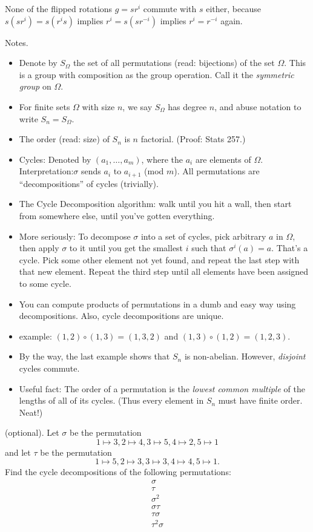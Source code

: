 \documentclass[1    0pt, answers]{exam} \renewcommand{\baselinestretch}{1.05}
\theoremstyle{plain}
\theoremstyle{definition}
\begin{document}
\begin{questions}
\begin{solution}
None of the flipped rotations $g = sr^i$ commute with $s$ either, because $s (s r^i) = s (r^i s)$ implies $r^i = s (s r^{-i})$ implies $r^i = r^{-i}$ again.
\end{solution}

Notes.
\begin{itemize}
    \item Denote by $S_{\Omega}$ the set of all permutations (read: bijections) of the set $\Omega$. This is a group with composition as the group operation. Call it the \emph{symmetric group} on $\Omega$.
    \item For finite sets $\Omega$ with size $n$, we say $S_{\Omega}$ has degree $n$, and abuse notation to write $S_n = S_{\Omega}$.
    \item The order (read: size) of $S_n$ is $n$ factorial. (Proof: Stats 257.)
    \item Cycles: Denoted by $(a_1, \ldots, a_m)$, where the $a_i$ are elements of $\Omega$. Interpretation:$\sigma$ sends $a_i$ to $a_{i + 1}$ (mod $m$). All permutations are ``decompositions'' of cycles (trivially).
    \item The Cycle Decomposition algorithm: walk until you hit a wall, then start from somewhere else, until you've gotten everything. 
    \item More seriously: To decompose $\sigma$ into a set of cycles, pick arbitrary $a$ in $\Omega$, then apply $\sigma$ to it until you get the smallest $i$ such that $\sigma^i(a) = a$. That's a cycle. Pick some other element not yet found, and repeat the last step with that new element. Repeat the third step until all elements have been assigned to some cycle.
    \item You can compute products of permutations in a dumb and easy way using decompositions. Also, cycle decompositions are unique.
    \item example: $(1,2) \circ (1,3) = (1, 3, 2)$ and $(1, 3) \circ (1, 2) = (1, 2, 3)$.
    \item By the way, the last example shows that $S_n$ is non-abelian. However, \emph{disjoint} cycles commute.
    \item Useful fact: The order of a permutation is the \emph{lowest common multiple} of the lengths of all of its cycles. (Thus every element in $S_n$ must have finite order. Neat!)
\end{itemize}

\question (optional). Let $\sigma$ be the permutation
\[ 1 \mapsto 3, 2 \mapsto 4, 3 \mapsto 5, 4 \mapsto 2, 5 \mapsto 1 \]
and let $\tau$ be the permutation
\[ 1 \mapsto 5, 2 \mapsto 3, 3 \mapsto 3, 4 \mapsto 4, 5 \mapsto 1. \]
Find the cycle decompositions of the following permutations:
\begin{align*}
\sigma \\
\tau \\
\sigma^2 \\
\sigma \tau \\
\tau \sigma \\
\tau^2 \sigma
\end{align*}


\end{questions}
\end{document}
